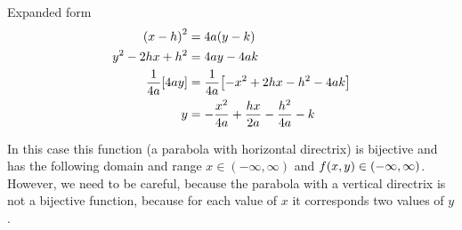 \documentclass[../main-notes.tex]{subfiles}
\begin{document}
\begin{note}{Expanded form}{~}
 \begin{align*}
    \qty(x-h)^2 &= 4a\qty(y-k) \\
    y^2 -2hx +h^2 &= 4ay-4ak \\
    \frac{1}{4a}\qty[4ay] &=\frac{1}{4a}\qty[-x^2 +2hx - h^2 -4ak] \\
    y &=-\frac{x^2}{4a} +\frac{hx}{2a} -\frac{h^2}{4a}  -k 
\end{align*}

In this case this function (a parabola with horizontal directrix) is bijective and has the following domain and range $x\in(-\infty,\infty)$ and $f(x,y)\in\qty(-\infty,\infty)$.
However, we need to be careful, because the parabola with a vertical directrix is not a bijective function, because for each value of $x$ it corresponds two values of $y$.
   
\end{note}


\end{document}
